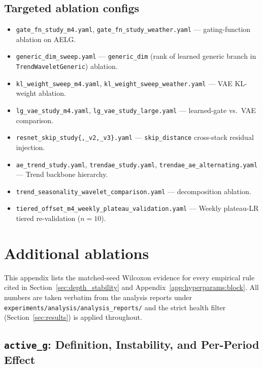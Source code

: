 \documentclass{article}
\begin{document}
\subsection{Targeted ablation configs}
\label{app:configs:ablations}

\begin{itemize}\itemsep -1pt
\item \texttt{gate\_fn\_study\_m4.yaml}, \texttt{gate\_fn\_study\_weather.yaml} --- gating-function ablation on AELG.
\item \texttt{generic\_dim\_sweep.yaml} --- \texttt{generic\_dim} (rank of learned generic branch in \texttt{TrendWaveletGeneric}) ablation.
\item \texttt{kl\_weight\_sweep\_m4.yaml}, \texttt{kl\_weight\_sweep\_weather.yaml} --- VAE KL-weight ablation.
\item \texttt{lg\_vae\_study\_m4.yaml}, \texttt{lg\_vae\_study\_large.yaml} --- learned-gate vs.\ VAE comparison.
\item \texttt{resnet\_skip\_study\{,\_v2,\_v3\}.yaml} --- \texttt{skip\_distance} cross-stack residual injection.
\item \texttt{ae\_trend\_study.yaml}, \texttt{trendae\_study.yaml}, \texttt{trendae\_ae\_alternating.yaml} --- Trend backbone hierarchy.
\item \texttt{trend\_seasonality\_wavelet\_comparison.yaml} --- decomposition ablation.
\item \texttt{tiered\_offset\_m4\_weekly\_plateau\_validation.yaml} --- Weekly plateau-LR tiered re-validation ($n=10$).
\end{itemize}


\section{Additional ablations}
\label{app:ablations}

This appendix lists the matched-seed Wilcoxon evidence for every empirical rule cited in Section~\ref{sec:depth_stability} and Appendix~\ref{app:hyperparams:block}. All numbers are taken verbatim from the analysis reports under \texttt{experiments/analysis/analysis\_reports/} and the strict health filter (Section~\ref{sec:results}) is applied throughout.

\subsection{\texttt{active\_g}: Definition, Instability, and Per-Period Effect}
\label{app:ablations:active_g}
\end{document}
